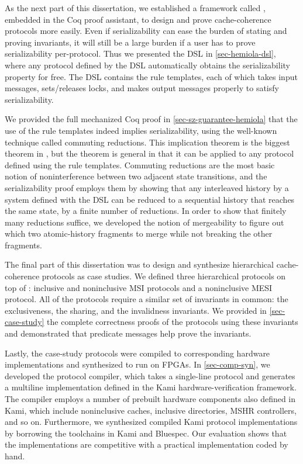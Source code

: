 As the next part of this dissertation, we established a framework called \hemiola{}, embedded in the Coq proof assistant, to design and prove cache-coherence protocols more easily.
Even if serializability can ease the burden of stating and proving invariants, it will still be a large burden if a user has to prove serializability per-protocol.
Thus we presented the \hemiola{} DSL in \autoref{sec-hemiola-dsl}, where any protocol defined by the DSL automatically obtains the serializability property for free.
The DSL contains the rule templates, each of which takes input messages, sets/releases locks, and makes output messages properly to satisfy serializability.

We provided the full mechanized Coq proof in \autoref{sec-sz-guarantee-hemiola} that the use of the rule templates indeed implies serializability, using the well-known technique called commuting reductions.
This implication theorem is the biggest theorem in \hemiola{}, but the theorem is general in that it can be applied to any protocol defined using the rule templates.
Commuting reductions are the most basic notion of noninterference between two adjacent state transitions, and the serializability proof employs them by showing that any interleaved history by a system defined with the \hemiola{} DSL can be reduced to a sequential history that reaches the same state, by a finite number of reductions.
In order to show that finitely many reductions suffice, we developed the notion of mergeability to figure out which two atomic-history fragments to merge while not breaking the other fragments.

The final part of this dissertation was to design and synthesize hierarchical cache-coherence protocols as case studies.
We defined three hierarchical protocols on top of \hemiola{}: inclusive and noninclusive MSI protocols and a noninclusive MESI protocol.
All of the protocols require a similar set of invariants in common: the exclusiveness, the sharing, and the invalidness invariants.
We provided in \autoref{sec-case-study} the complete correctness proofs of the protocols using these invariants and demonstrated that predicate messages help prove the invariants.

Lastly, the case-study protocols were compiled to corresponding hardware implementations and synthesized to run on FPGAs.
In \autoref{sec-comp-syn}, we developed the protocol compiler, which takes a single-line \hemiola{} protocol and generates a multiline implementation defined in the Kami hardware-verification framework.
The compiler employs a number of prebuilt hardware components also defined in Kami, which include noninclusive caches, inclusive directories, MSHR controllers, and so on.
Furthermore, we synthesized compiled Kami protocol implementations by borrowing the toolchains in Kami and Bluespec.
Our evaluation shows that the implementations are competitive with a practical implementation coded by hand.

